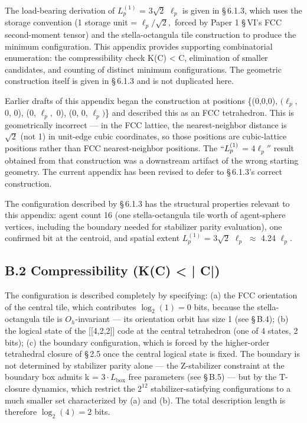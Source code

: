 \documentclass[11pt,oneside]{report}
\theoremstyle{definition}
\theoremstyle{remark}
\begin{document}
The load-bearing derivation of \ensuremath{L_{p}^{(1)}} = \ensuremath{3\sqrt{2}} \ensuremath{\ell_{p}} is given in \S\,6.1.3,
which uses the storage convention (1 storage unit = \ensuremath{\ell_{p}/\sqrt{2},} forced by
Paper 1 \S\,VI's FCC second-moment tensor) and the stella-octangula tile
construction to produce the minimum configuration. This appendix
provides supporting combinatorial enumeration: the compressibility check
K(C) \textless{} \textbar C\textbar, elimination of smaller candidates,
and counting of distinct minimum configurations. The geometric
construction itself is given in \S\,6.1.3 and is not duplicated here.

Earlier drafts of this appendix began the construction at positions
\{(0,0,0), \ensuremath{(\ell_{p},} 0, 0), (0, \ensuremath{\ell_{p},} 0), (0, 0, \ensuremath{\ell_{p})}\} and described this as an
FCC tetrahedron. This is geometrically incorrect --- in the FCC lattice,
the nearest-neighbor distance is \ensuremath{\sqrt{2}} (not 1) in unit-edge cubic
coordinates, so those positions are cubic-lattice positions rather than
FCC nearest-neighbor positions. The \ensuremath{``L_{p}^{(1)}} = \ensuremath{4\ell_{p}''} result
obtained from that construction was a downstream artifact of the wrong
starting geometry. The current appendix has been revised to defer to
\S\,6.1.3's correct construction.

The configuration described by \S\,6.1.3 has the structural properties
relevant to this appendix: agent count 16 (one stella-octangula tile
worth of agent-sphere vertices, including the boundary needed for
stabilizer parity evaluation), one confirmed bit at the centroid, and
spatial extent \ensuremath{L_{p}^{(1)}} = \ensuremath{3\sqrt{2}} \ensuremath{\ell_{p}} \ensuremath{\approx} 4.24 \ensuremath{\ell_{p}.}

\subsection*{B.2 Compressibility (K(C) < | C|)}

The configuration is described completely by specifying: (a) the FCC
orientation of the central tile, which contributes \ensuremath{\log_2(1) = 0} bits,
because the stella-octangula tile is \ensuremath{O_{h}}-invariant --- its orientation
orbit has size 1 (see \S\,B.4); (b) the logical state of the
[[4,2,2]] code at the central tetrahedron (one of 4 states, 2 bits); (c)
the boundary configuration, which is forced by the higher-order
tetrahedral closure of \S\,2.5 once the central logical state is fixed.
The boundary is not determined by stabilizer parity alone --- the
Z-stabilizer constraint at the boundary box admits k = \ensuremath{3\cdot L_{\mathrm{box}}}
free parameters (see \S\,B.5) --- but by the T-closure dynamics, which
restrict the \ensuremath{2^{12}} stabilizer-satisfying configurations to a much smaller
set characterized by (a) and (b). The total description length is
therefore \ensuremath{\log_2(4) = 2} bits.
\end{document}
